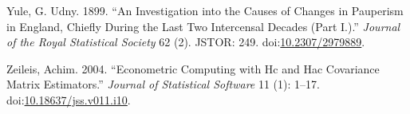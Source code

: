 \documentclass[]{article}
\begin{document}
\hypertarget{ref-Yule1899a}{}
Yule, G. Udny. 1899. ``An Investigation into the Causes of Changes in
Pauperism in England, Chiefly During the Last Two Intercensal Decades
(Part I.).'' \emph{Journal of the Royal Statistical Society} 62 (2).
JSTOR: 249. doi:\href{https://doi.org/10.2307/2979889}{10.2307/2979889}.

\hypertarget{ref-Zeileis2004a}{}
Zeileis, Achim. 2004. ``Econometric Computing with Hc and Hac Covariance
Matrix Estimators.'' \emph{Journal of Statistical Software} 11 (1):
1--17.
doi:\href{https://doi.org/10.18637/jss.v011.i10}{10.18637/jss.v011.i10}.
\end{document}
